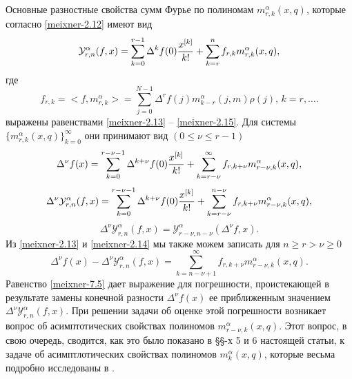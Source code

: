 Основные разностные свойства  сумм Фурье по полиномам $m_{r,k}^{\alpha}(x,q)$, которые согласно \eqref{meixner-2.12} имеют вид
\begin{equation}\label{meixner-7.1}
 \mathcal{Y}_{r,n}^{\alpha}(f,x)= \sum_{k=0}^{r-1}\Delta^kf(0){x^{[k]}\over k!} +\sum_{k=r}^{n}f_{r,k}m_{r,k}^{\alpha}(x,q),
  \end{equation}
где
\begin{equation*}
f_{r,k}= <f,m_{r,k}^{\alpha}>=\sum_{j=0}^{N-1}\Delta^rf(j)m_{k-r}^{\alpha}(j,m)\rho(j),\, k=r,\ldots.
 \end{equation*}
выражены равенствами \eqref{meixner-2.13} -- \eqref{meixner-2.15}. Для системы
$\{m_{r,k}^{\alpha}(x,q)\}_{k=0}^\infty$ они принимают вид $(0\le\nu\le r-1)$
 \begin{equation}\label{meixner-7.2}
 \Delta^\nu f(x)= \sum_{k=0}^{r-\nu-1}\Delta^{k+\nu}f(0){x^{[k]}\over k!} +\sum_{k=r-\nu}^\infty f_{r,k+\nu} m_{r-\nu,k}^{\alpha}(x,q),
  \end{equation}
  \begin{equation}\label{meixner-7.3}
 \Delta^\nu\mathcal{Y}_{r,n}^{\alpha}(f,x)= \sum_{k=0}^{r-\nu-1}\Delta^{k+\nu}f(0){x^{[k]}\over k!} +\sum_{k=r-\nu}^{n-\nu} f_{r,k+\nu}m_{r-\nu,k}^{\alpha}(x,q),
  \end{equation}
 \begin{equation}\label{meixner-7.4}
 \Delta^\nu\mathcal{Y}_{r,n}^{\alpha}(f,x) = \mathcal{Y}_{r-\nu,n-\nu}^{\alpha}(\Delta^\nu f,x).
  \end{equation}
Из \eqref{meixner-2.13} и \eqref{meixner-2.14} мы также можем записать для $n\ge r>\nu\ge0$
\begin{equation}\label{meixner-7.5}
 \Delta^\nu f(x)-\Delta^\nu\mathcal{Y}_{r,n}^{\alpha}(f,x)= \sum_{k=n-\nu+1}^\infty f_{r,k+\nu} m_{r-\nu,k}^{\alpha}(x,q).
  \end{equation}
Равенство  \eqref{meixner-7.5} дает выражение для погрешности, проистекающей в результате замены конечной разности  $\Delta^\nu f(x)$ ее приближенным значением $\Delta^\nu\mathcal{Y}_{r,n}^{\alpha}(f,x)$. При решении задачи об оценке этой погрешности возникает вопрос об асимптотических свойствах полиномов $m_{r-\nu,k}^{\alpha}(x,q)$. Этот вопрос, в свою очередь, сводится, как это было показано в \S\S-х 5 и 6 настоящей статьи, к задаче об асимптлотических свойствах полиномов   $m_k^{\alpha}(x,q)$, которые весьма подробно исследованы в \cite{meixner-22}.

